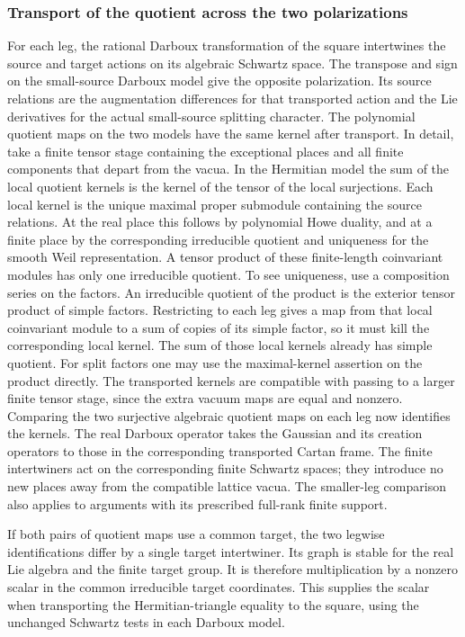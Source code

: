 \subsubsection{Transport of the quotient across the two polarizations}
For each leg, the rational Darboux transformation of the
square intertwines the source and target actions on its
algebraic Schwartz space. The transpose and sign on the
small-source Darboux model give the opposite polarization.
Its source relations are the augmentation differences
for that transported action and the Lie derivatives for the
actual small-source splitting character. The polynomial
quotient maps on the two models have the same kernel after
transport. In detail, take a finite tensor stage containing
the exceptional places and all finite components that
depart from the vacua. In the Hermitian model the sum of the
local quotient kernels is the kernel of the tensor of the
local surjections. Each local kernel is the unique maximal
proper submodule containing the source relations. At the
real place this follows by polynomial Howe duality, and at
a finite place by the corresponding irreducible quotient
and uniqueness for the smooth Weil representation. A tensor
product of these finite-length coinvariant modules has only
one irreducible quotient. To see uniqueness, use a composition
series on the factors. An irreducible quotient of the product
is the exterior tensor product of simple factors. Restricting
to each leg gives a map from that local coinvariant module to
a sum of copies of its simple factor, so it must kill the
corresponding local kernel. The sum of those local kernels
already has simple quotient. For split factors one may use
the maximal-kernel assertion on the product directly.
The transported kernels are compatible with passing to a
larger finite tensor stage, since the extra vacuum maps are
equal and nonzero. Comparing the two surjective algebraic
quotient maps on each leg now identifies the kernels.
The real Darboux operator takes the Gaussian and its
creation operators to those in the corresponding
transported Cartan frame. The finite intertwiners act
on the corresponding finite Schwartz spaces; they
introduce no new places away from the compatible
lattice vacua. The smaller-leg comparison also
applies to arguments with its prescribed full-rank
finite support.

If both pairs of quotient maps use a common target, the
two legwise identifications differ by a single target
intertwiner. Its graph is stable for the real Lie algebra
and the finite target group. It is therefore multiplication
by a nonzero scalar in the common irreducible target
coordinates. This supplies the scalar when transporting
the Hermitian-triangle equality to the square, using the
unchanged Schwartz tests in each Darboux model.


